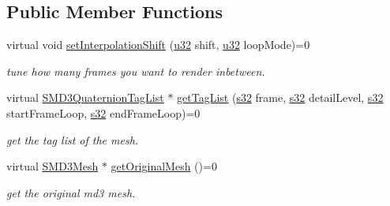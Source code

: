 \subsection*{Public Member Functions}
\begin{DoxyCompactItemize}
\item 
\mbox{\label{classirr_1_1scene_1_1IAnimatedMeshMD3_ae72d5c1bbef975834ddb3fdf8d73e608}} 
virtual void \hyperlink{classirr_1_1scene_1_1IAnimatedMeshMD3_ae72d5c1bbef975834ddb3fdf8d73e608}{set\+Interpolation\+Shift} (\hyperlink{namespaceirr_a0416a53257075833e7002efd0a18e804}{u32} shift, \hyperlink{namespaceirr_a0416a53257075833e7002efd0a18e804}{u32} loop\+Mode)=0
\begin{DoxyCompactList}\small\item\em tune how many frames you want to render inbetween. \end{DoxyCompactList}\item 
\mbox{\label{classirr_1_1scene_1_1IAnimatedMeshMD3_a1de2fa2fc55ab8fb7f881f3e9a9b0d78}} 
virtual \hyperlink{structirr_1_1scene_1_1SMD3QuaternionTagList}{S\+M\+D3\+Quaternion\+Tag\+List} $\ast$ \hyperlink{classirr_1_1scene_1_1IAnimatedMeshMD3_a1de2fa2fc55ab8fb7f881f3e9a9b0d78}{get\+Tag\+List} (\hyperlink{namespaceirr_ac66849b7a6ed16e30ebede579f9b47c6}{s32} frame, \hyperlink{namespaceirr_ac66849b7a6ed16e30ebede579f9b47c6}{s32} detail\+Level, \hyperlink{namespaceirr_ac66849b7a6ed16e30ebede579f9b47c6}{s32} start\+Frame\+Loop, \hyperlink{namespaceirr_ac66849b7a6ed16e30ebede579f9b47c6}{s32} end\+Frame\+Loop)=0
\begin{DoxyCompactList}\small\item\em get the tag list of the mesh. \end{DoxyCompactList}\item 
\mbox{\label{classirr_1_1scene_1_1IAnimatedMeshMD3_ac6b6b53da9413b4404bcad0e68561bcb}} 
virtual \hyperlink{structirr_1_1scene_1_1SMD3Mesh}{S\+M\+D3\+Mesh} $\ast$ \hyperlink{classirr_1_1scene_1_1IAnimatedMeshMD3_ac6b6b53da9413b4404bcad0e68561bcb}{get\+Original\+Mesh} ()=0
\begin{DoxyCompactList}\small\item\em get the original md3 mesh. \end{DoxyCompactList}\item 
\mbox{\label{classirr_1_1scene_1_1IAnimatedMeshMD3_ae72d5c1bbef975834ddb3fdf8d73e608}} 

\end{DoxyCompactItemize}
